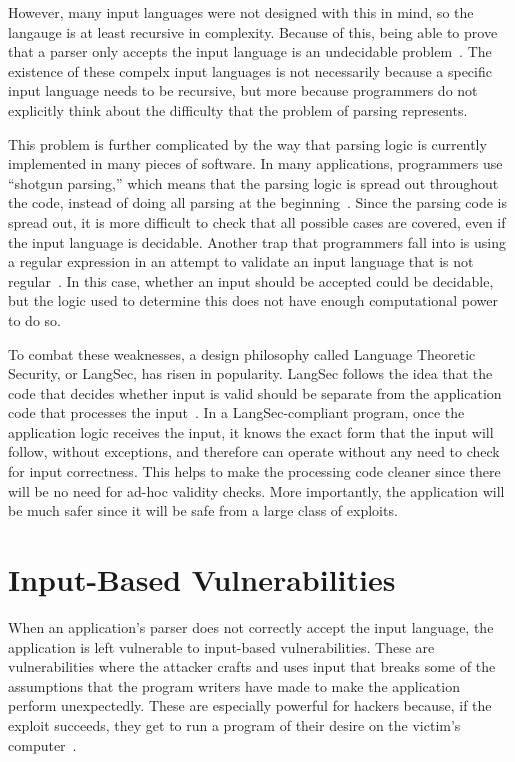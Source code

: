 However, many input languages were not designed with this in mind, so the langauge is at least recursive in complexity.  Because of this, being able to prove that a parser only accepts the input language is an undecidable problem~\cite{sassaman2011halting}.  The existence of these compelx input languages is not necessarily because a specific input language needs to be recursive, but more because programmers do not explicitly think about the difficulty that the problem of parsing represents.

This problem is further complicated by the way that parsing logic is currently implemented in many pieces of software.  In many applications, programmers use ``shotgun parsing,'' which means that the parsing logic is spread out throughout the code, instead of doing all parsing at the beginning~\cite{bratus2017parsing}.  Since the parsing code is spread out, it is more difficult to check that all possible cases are covered, even if the input language is decidable.  Another trap that programmers fall into is using a regular expression in an attempt to validate an input language that is not regular~\cite{bratus2017parsing}.  In this case, whether an input should be accepted could be decidable, but the logic used to determine this does not have enough computational power to do so.

To combat these weaknesses, a design philosophy called Language Theoretic Security, or LangSec, has risen in popularity.  LangSec follows the idea that the code that decides whether input is valid should be separate from the application code that processes the input~\cite{langsec_language-theoretic_security}.  In a LangSec-compliant program, once the application logic receives the input, it knows the exact form that the input will follow, without exceptions, and therefore can operate without any need to check for input correctness.  This helps to make the processing code cleaner since there will be no need for ad-hoc validity checks.  More importantly, the application will be much safer since it will be safe from a large class of exploits.

\section{Input-Based Vulnerabilities}
\label{sec:inputBasedVulnerabilities}
When an application's parser does not correctly accept the input language, the application is left vulnerable to input-based vulnerabilities.  These are vulnerabilities where the attacker crafts and uses input that breaks some of the assumptions that the program writers have made to make the application perform unexpectedly.  These are especially powerful for hackers because, if the exploit succeeds, they get to run a program of their desire on the victim's computer~\cite{sassaman2011halting}.

